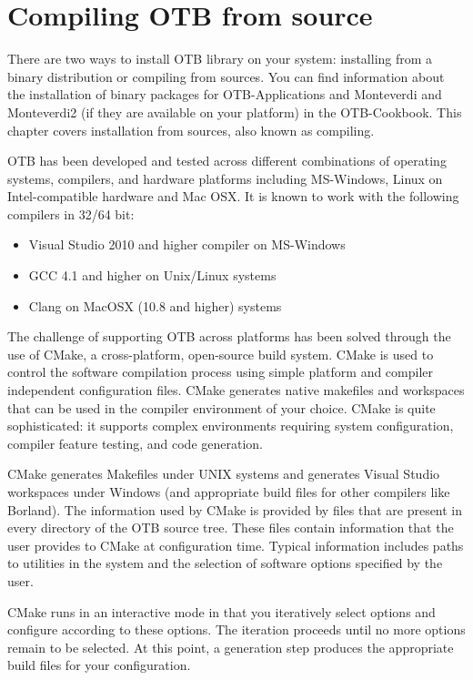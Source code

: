\setcounter{secnumdepth}{3}

\chapter{Compiling OTB from source}
\label{chapter:Installation}

There are two ways to install OTB library on your system: installing from a binary distribution or compiling from sources. 
You can find information about the installation of binary packages for OTB-Applications and Monteverdi and Monteverdi2 (if they are available on your platform) in the OTB-Cookbook.
This chapter covers installation from sources, also known as compiling.

OTB has been developed and tested across different combinations of operating systems, compilers, and hardware platforms including MS-Windows, Linux on Intel-compatible hardware and Mac OSX.  It is known to work with the following compilers in 32/64 bit:
\begin{itemize}
\item Visual Studio 2010 and higher compiler on MS-Windows
\item GCC 4.1 and higher on Unix/Linux systems
\item Clang on MacOSX (10.8 and higher) systems
\end{itemize}

The challenge of supporting OTB across platforms has been solved through the use of CMake, a cross-platform, open-source
build system. CMake is used to control the software compilation process using simple platform and compiler independent
configuration files.  CMake generates native makefiles and workspaces that can be used in the compiler environment of
your choice. CMake is quite sophisticated: it supports complex environments requiring system configuration, compiler
feature testing, and code generation.

CMake generates Makefiles under UNIX systems and generates Visual Studio workspaces under Windows (and appropriate build
files for other compilers like Borland). The information used by CMake is provided by  files that
are present in every directory of the OTB source tree. These files contain information that the user provides to CMake
at configuration time. Typical information includes paths to utilities in the system and the selection of software
options specified by the user.

CMake runs in an interactive mode in that you iteratively select
options and configure according to these options. The iteration
proceeds until no more options remain to be selected. At this point, a
generation step produces the appropriate build files for your
configuration.


